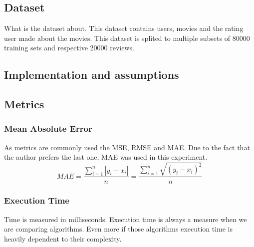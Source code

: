 \subsection{Dataset}
What is the dataset about. This dataset contains users, movies and the rating user made about the movies.
This dataset is splited to multiple subsets of 80000 training sets and respective 20000 reviews.
\cite{MovieLens:3}

\subsection{Implementation and assumptions}
\subsection{Metrics}
\subsubsection{Mean Absolute Error}
As metrics are commonly used the MSE, RMSE and MAE. Due to the fact that the author prefers the last one, MAE was used in this experiment.
\begin{equation}
MAE = \frac{\sum_{i=1}^{n}{|y_{i}-x_{i}|} }{n} = \frac{\sum_{i=1}^{n}\sqrt{{(y_{i}-x_{i})}^{2}}}{n}
\end{equation}
\subsubsection{Execution Time}
Time is measured in milliseconds.
Execution time is always a measure when we are comparing algorithms. Even more if those algorithms execution time is heavily dependent to their complexity.
